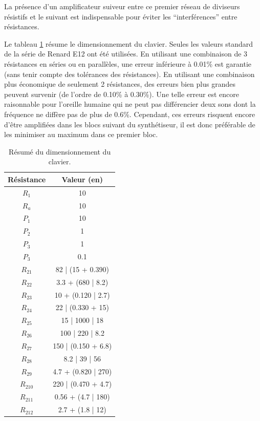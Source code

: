 La présence d'un amplificateur suiveur entre ce premier
réseau de diviseurs résistifs et le suivant est indispensable
pour éviter les ``interférences'' entre résistances.

Le tableau \ref{tab:keyboard-dim} résume le dimensionnement
du clavier. Seules les valeurs standard de la série de Renard
E12 ont été utilisées. En utilisant une combinaison de 3
résistances en séries ou en parallèles, une erreur inférieure
à 0.01\% est garantie (sans tenir compte des tolérances des
résistances). En utilisant une combinaison plus économique
de seulement 2 résistances, des erreurs bien plus grandes
peuvent survenir (de l'ordre de 0.10\% à 0.30\%). Une telle
erreur est encore raisonnable pour l'oreille humaine qui ne
peut pas différencier deux sons dont la fréquence ne diffère
pas de plus de 0.6\%\cite{frequency-jnd}. Cependant, ces erreurs
risquent encore d'être amplifiées dans les blocs suivant du
synthétiseur, il est donc préférable de les minimiser au maximum
dans ce premier bloc.

\begin{table}[ht]
	\centering
		\begin{tabular}{|c|c|}
			\hline
				Résistance & Valeur (en\unit{}{\kilo\ohm}) \\
			\hline
				$R_1$ & 10 \\
			\hline
				$R_a$ & 10 \\
			\hline
				$P_1$ & 10 \\
			\hline
				$P_2$ & 1 \\
			\hline
				$P_3$ & 1 \\
			\hline
				$P_3$ & 0.1 \\
			\hline
				$R_{21}$ & 82 | (15 + 0.390) \\
			\hline
				$R_{22}$ & 3.3 + (680 | 8.2) \\
			\hline
				$R_{23}$ & 10 + (0.120 | 2.7) \\
			\hline
				$R_{24}$ & 22 | (0.330 + 15) \\
			\hline
				$R_{25}$ & 15 | 1000 | 18 \\
			\hline
				$R_{26}$ & 100 | 220 | 8.2 \\
			\hline
				$R_{27}$ & 150 | (0.150 + 6.8) \\
			\hline
				$R_{28}$ & 8.2 | 39 | 56 \\
			\hline
				$R_{29}$ & 4.7 + (0.820 | 270) \\
			\hline
				$R_{210}$ & 220 | (0.470 + 4.7) \\
			\hline
				$R_{211}$ & 0.56 + (4.7 | 180) \\
			\hline
				$R_{212}$ & 2.7 + (1.8 | 12) \\
			\hline
		\end{tabular}
	\caption{Résumé du dimensionnement du clavier.}
	\label{tab:keyboard-dim}
\end{table}

